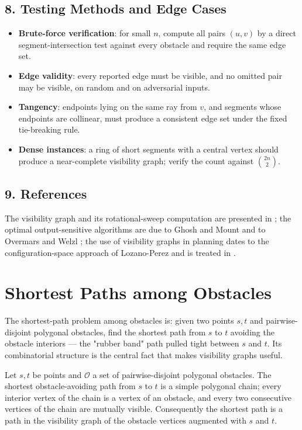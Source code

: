 \subsection{8. Testing Methods and Edge Cases}

\begin{itemize}
\item \textbf{Brute-force verification}: for small $n$, compute all pairs
  $(u,v)$ by a direct segment-intersection test against every obstacle and
  require the same edge set.
\item \textbf{Edge validity}: every reported edge must be visible, and no
  omitted pair may be visible, on random and on adversarial inputs.
\item \textbf{Tangency}: endpoints lying on the same ray from $v$, and
  segments whose endpoints are collinear, must produce a consistent edge set
  under the fixed tie-breaking rule.
\item \textbf{Dense instances}: a ring of short segments with a central
  vertex should produce a near-complete visibility graph; verify the count
  against $\binom{2n}{2}$.
\end{itemize}

\subsection{9. References}

The visibility graph and its rotational-sweep computation are presented in
\cite{berg2008}; the optimal output-sensitive algorithms are due to Ghosh
and Mount \cite{ghoshmount1991} and to Overmars and Welzl
\cite{overmarswelzl1992}; the use of visibility graphs in planning dates to
the configuration-space approach of Lozano-Perez \cite{lozanoperez1983} and
is treated in \cite{orourke1987,sharir1995}.

\section{Shortest Paths among Obstacles}
\label{sec:visibility_shortest_paths}

The shortest-path problem among obstacles is: given two points $s, t$ and
pairwise-disjoint polygonal obstacles, find the shortest path from $s$ to
$t$ avoiding the obstacle interiors --- the "rubber band" path pulled tight
between $s$ and $t$. Its combinatorial structure is the central fact that
makes visibility graphs useful.

\begin{theorem}\label{thm:vis_shortest_path}
  Let $s, t$ be points and $\mathcal{O}$ a set of pairwise-disjoint polygonal
  obstacles. The shortest obstacle-avoiding path from $s$ to $t$ is a simple
  polygonal chain; every interior vertex of the chain is a vertex of an
  obstacle, and every two consecutive vertices of the chain are mutually
  visible. Consequently the shortest path is a path in the visibility graph
  of the obstacle vertices augmented with $s$ and $t$.
\end{theorem}

